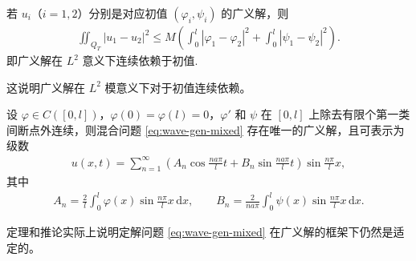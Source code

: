 \documentclass[../../main.tex]{subfiles}%
\begin{document}
\begin{corollary}
若 $u_i$（$i=1,2$）分别是对应初值 $(\varphi_i,\psi_i)$ 的广义解，则
\begin{align}
\iint_{Q_T}|u_1-u_2|^2
\leqslant M\left(\int_0^l|\varphi_1-\varphi_2|^2+\int_0^l|\psi_1-\psi_2|^2\right). \label{eq:weak-stab}
\end{align}
即广义解在 $L^2$ 意义下连续依赖于初值.
\end{corollary}
\begin{remark}
这说明广义解在 $L^2$ 模意义下对于初值连续依赖。
\end{remark}

\begin{theorem}
设 $\varphi\in C([0,l])$，$\varphi(0)=\varphi(l)=0$，$\varphi'$ 和 $\psi$ 在 $[0,l]$ 上除去有限个第一类间断点外连续，则混合问题 \eqref{eq:wave-gen-mixed} 存在唯一的广义解，且可表示为级数
\begin{align}
u(x,t)=\sum_{n=1}^{\infty}\left(A_n\cos\frac{na\pi}{l}t+B_n\sin\frac{na\pi}{l}t\right)\sin\frac{n\pi}{l}x, \label{eq:gen-sol-series}
\end{align}
其中
\begin{align}
A_n=\frac{2}{l}\int_0^l\varphi(x)\sin\frac{n\pi}{l}x\,\mathrm{d}x,\qquad
B_n=\frac{2}{na\pi}\int_0^l\psi(x)\sin\frac{n\pi}{l}x\,\mathrm{d}x. \label{eq:gen-coeff}
\end{align}
\end{theorem}
\begin{remark}
定理和推论实际上说明定解问题 \eqref{eq:wave-gen-mixed} 在广义解的框架下仍然是适定的。
\end{remark}
\end{document}
